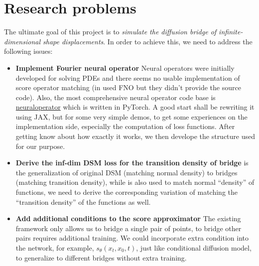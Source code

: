 \documentclass{article}
\begin{document}
\section{Research problems}
The ultimate goal of this project is to \emph{simulate the diffusion bridge of infinite-dimensional shape displacements}. In order to achieve this, we need to address the following issues:
\begin{itemize}
    \item \textbf{Implement Fourier neural operator} Neural operators were initially developed for solving PDEs and there seems no usable implementation of score operator matching (in \cite{lim2023scorebased} used FNO but they didn't provide the source code). Also, the most comprehensive neural operator code base is \href{https://github.com/neuraloperator/neuraloperator}{neuraloperator} which is written in PyTorch. A good start shall be rewriting it using JAX, but for some very simple demos, to get some experiences on the implementation side, especially the computation of loss functions. After getting know about how exactly it works, we then develope the structure used for our purpose.
    \item \textbf{Derive the inf-dim DSM loss for the transition density of bridge} is the generalization of original DSM (matching normal density) to bridges (matching transition density), while is also used to match normal ``density'' of functions, we need to derive the corresponding variation of matching the ``transition density'' of the functions as well.
    \item \textbf{Add additional conditions to the score approximator} The existing framework only allows us to bridge a single pair of points, to bridge other pairs requires additional training. We could incorporate extra condition into the network, for example, $s_\theta(x_t, x_0, t)$, just like conditional diffusion model, to generalize to different bridges without extra training.
\end{itemize}



\end{document}
